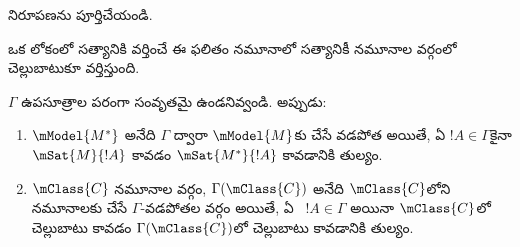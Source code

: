 \documentclass[../../../include/open-logic-section]{subfiles}
\begin{document}
\begin{prob}
   నిరూపణను పూర్తిచేయండి.
\end{prob}

ఒక లోకంలో సత్యానికి వర్తించే ఈ ఫలితం
నమూనాలో సత్యానికీ నమూనాల వర్గంలో చెల్లుబాటుకూ
వర్తిస్తుంది.

\begin{cor}
  $\Gamma$ ఉపసూత్రాల పరంగా సంవృతమై ఉండనివ్వండి.
  అప్పుడు:
  \begin{enumerate}
  \item $\mModel{M^*}$ అనేది $\Gamma$ ద్వారా
    $\mModel{M}$కు చేసే వడపోత అయితే, ఏ
    $!A \in \Gamma$కైనా $\mSat{M}{!A}$ కావడం
    $\mSat{M^*}{!A}$ కావడానికి తుల్యం.
  \item $\mClass{C}$ నమూనాల వర్గం,
    $\Gamma(\mClass{C})$ అనేది $\mClass{C}$లోని
    నమూనాలకు చేసే $\Gamma$-వడపోతల వర్గం అయితే,
    ఏ ~$!A \in \Gamma$ అయినా
    $\mClass{C}$లో చెల్లుబాటు కావడం
    $\Gamma(\mClass{C})$లో చెల్లుబాటు కావడానికి తుల్యం.
  \end{enumerate}
\end{cor}
\end{document}
